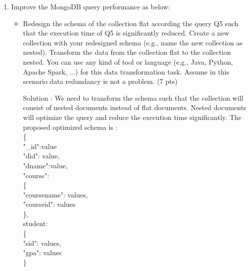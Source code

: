 \documentclass[10pt]{article}
\begin{document}
\begin{enumerate}
\begin{enumerate}
			\end{enumerate}
		\item  Improve the MongoDB query performance as below:
		\begin{itemize}
			\item Redesign the schema of the collection flat according the query Q5 such that the execution
			time of Q5 is significantly reduced. Create a new collection with your redesigned
			schema (e.g., name the new collection as nested). Transform the data from the collection
			flat to the collection nested. You can use any kind of tool or language (e.g., Java,
			Python, Apache Spark, ...) for this data transformation task. Assume in this scenario
			data redundancy is not a problem. (7 pts)
			
			
			Solution :
			We need to transform the schema such that the collection will consist of nested documents instead of flat documents. Nested documents will optimize the query and reduce the execution time significantly. The proposed optimized schema is :
			\\\{
			    \\"\_id":value
			    \\"did": value,
			    \\"dname":value,
			    \\"course":
			   \\ \{
			            \\"coursename": values,
			            \\"courseid": values
			   \\ \},
			   \\student:
			   \\ \{
			            \\"sid": values,
			            \\"gpa": values
			   \\ \}
			   

\end{itemize}
\end{enumerate}
\end{document}
